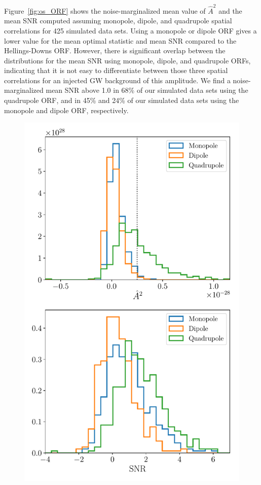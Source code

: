 \documentclass[twocolumn,aps,prd,superscriptaddress]{revtex4-1}
\begin{document}
Figure~\ref{fig:os_ORF} shows the noise-marginalized mean value of $\hat{A}^2$ and the mean SNR 
computed assuming monopole, dipole, and quadrupole spatial correlations 
for 425 simulated data sets. Using a monopole or dipole ORF 
gives a lower value for the mean optimal statistic and mean SNR compared to the 
Hellings-Downs ORF. 
However, there is significant overlap between the distributions for the mean SNR using 
monopole, dipole, and quadrupole ORFs, indicating that it is not easy to differentiate 
between those three spatial correlations for an injected GW background of this amplitude. 
We find a noise-marginalized mean SNR above 1.0 in 68\% of our simulated data sets 
using the quadrupole ORF, and in 45\% and 24\% of our simulated data sets 
using the monopole and dipole ORF, respectively.
\begin{figure}[ht]
	\includegraphics[width=\columnwidth]{plots/os_datasetstats_5e-15_ORF.pdf}

\end{figure}
\end{document}
